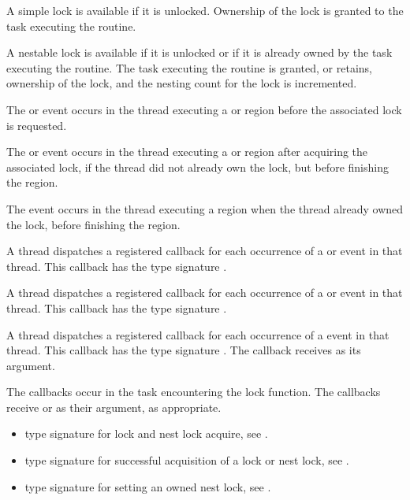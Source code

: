 A simple lock is available if it is unlocked. Ownership of the lock is 
granted to the task executing the routine.

A nestable lock is available if it is unlocked or if it is already owned by 
the task executing the routine. The task executing the routine is granted, 
or retains, ownership of the lock, and the nesting count for the lock is 
incremented.

\events

The  or  event occurs in the thread 
executing a  or  region
before the associated lock is requested.

The  or  event occurs in the thread 
executing a  or  region
after acquiring the associated lock, if the thread did not already own the lock, 
but before finishing the region.

The  event occurs in the thread 
executing a  region
when the thread already owned the lock, 
before finishing the region.


\tools

A thread dispatches a registered 
callback for each occurrence of a  or  event 
in that thread.  This callback has the type signature .

A thread dispatches a registered 
callback for each occurrence of a  or  event 
in that thread.  This callback has the type signature .

A thread dispatches a registered 
callback for each occurrence of a  event 
in that thread. This callback has the type signature .
The callback receives  as its  argument.

The callbacks occur in the task encountering
the lock function.  The callbacks receive  or 
  as their  argument, as appropriate.


\crossreferences
\begin{itemize}
\item {} type signature for lock
  and nest lock acquire, see .
\item {} type signature for
  successful acquisition of a lock or nest lock, see .
\item {} type signature for setting
  an owned nest lock, see .
\end{itemize}




